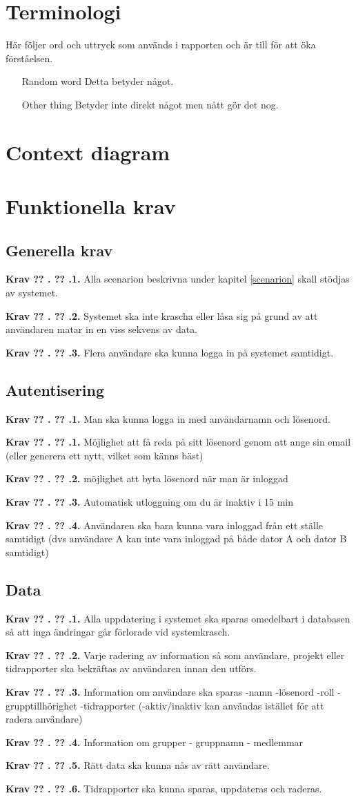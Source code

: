 \documentclass[a4paper]{article}
\newcommand\getcurrentref[1]{%
 \ifnumequal{\value{#1}}{0}
  {??}
  {\the\value{#1}}%
}
\newcommand\requirement[2]{
	\numberedrow{Krav}{#1}{#2}
}
\newcommand\numberedrow[3]{
	\noindent
	\textbf{#1 \getcurrentref{section}.\getcurrentref{subsection}.#2.} #3
	
}
\begin{document}
\section{Terminologi}
Här följer ord och uttryck som används i rapporten och är till för att öka förståelsen.
\begin{itemize}
\item [Random word] Detta betyder något.
\item [Other thing] Betyder inte direkt något men nått gör det nog.
\end{itemize}
\section{Context diagram}
\section{Funktionella krav}
\subsection{Generella krav}
 \requirement{1}{Alla scenarion beskrivna under kapitel \ref{scenarion} skall stödjas av systemet.}
 \requirement{2}{Systemet ska inte krascha eller låsa sig på grund av att användaren matar in en viss sekvens av data.}
 \requirement{3}{Flera användare ska kunna logga in på systemet samtidigt.}
 
\subsection{Autentisering}
\requirement{1}{Man ska kunna logga in med användarnamn och lösenord.}
\requirement{1}{Möjlighet att få reda på sitt lösenord genom att ange sin email (eller generera ett nytt, vilket som känns bäst)}
\requirement{2}{möjlighet att byta lösenord när man är inloggad}
\requirement{3}{Automatisk utloggning om du är inaktiv i 15 min}
\requirement{4}{Användaren ska bara kunna vara inloggad från ett ställe samtidigt (dvs användare A kan inte vara inloggad på både dator A och dator B samtidigt)}

\subsection{Data}
\requirement{1}{Alla uppdatering i systemet ska sparas omedelbart i databasen så att inga ändringar går förlorade vid systemkrasch.}
\requirement{2}{Varje radering av information så som användare, projekt eller tidrapporter ska bekräftas av användaren innan den utförs.}
\requirement{3}{Information om användare ska sparas 
-namn
-lösenord
-roll
-grupptillhörighet
-tidrapporter
(-aktiv/inaktiv kan användas istället för att radera användare)}
\requirement{4}{Information om grupper
- gruppnamn
- medlemmar}
\requirement{5}{Rätt data ska kunna nås av rätt användare.}
\requirement{6}{Tidrapporter ska kunna sparas, uppdateras och raderas.}
\end{document}
